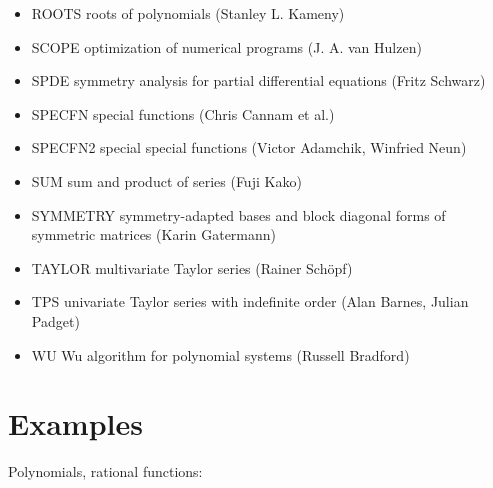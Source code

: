 \begin{itemize}
\item ROOTS  roots of polynomials (Stanley L. Kameny)
 
\item SCOPE  optimization of numerical programs (J. A. van Hulzen)
 
\item SPDE symmetry analysis for partial differential equations
         (Fritz Schwarz)
 
\item SPECFN  special functions (Chris Cannam et al.)

\item SPECFN2  special special functions (Victor Adamchik,
Winfried Neun)

\item SUM sum and product of series (Fuji Kako)

\item SYMMETRY  symmetry-adapted bases and block diagonal forms of
symmetric matrices (Karin Gatermann)

\item TAYLOR multivariate Taylor series (Rainer Sch\"opf)
 
\item TPS  univariate Taylor series with indefinite order
         (Alan Barnes, Julian Padget)

\item WU  Wu algorithm for polynomial systems (Russell Bradford)
\end{itemize} 
\section{Examples}

Polynomials, rational functions:
 
